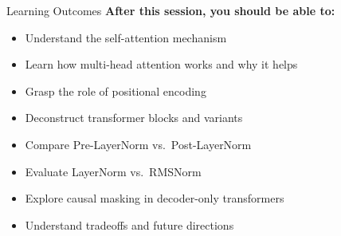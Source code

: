 \begin{frame}{Learning Outcomes}
  \textbf{After this session, you should be able to:}
  \begin{itemize}
    \item[$\blacktriangleright$] Understand the self-attention mechanism
    \item[$\blacktriangleright$] Learn how multi-head attention works and why it helps
    \item[$\blacktriangleright$] Grasp the role of positional encoding
    \item[$\blacktriangleright$] Deconstruct transformer blocks and variants
    \item[$\blacktriangleright$] Compare Pre-LayerNorm vs.\ Post-LayerNorm
    \item[$\blacktriangleright$] Evaluate LayerNorm vs.\ RMSNorm
    \item[$\blacktriangleright$] Explore causal masking in decoder-only transformers
    \item[$\blacktriangleright$] Understand tradeoffs and future directions
  \end{itemize}
\end{frame}
